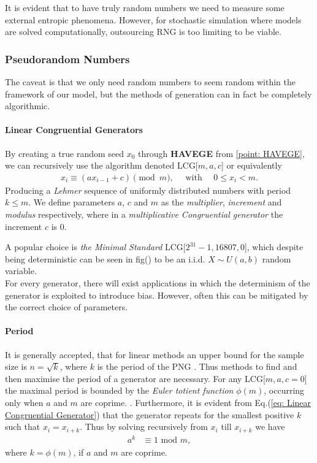 \documentclass{article}
\begin{document}
It is evident that to have truly random numbers we need to measure some external entropic phenomena.
However, for stochastic simulation where models are solved computationally, outsourcing RNG is too 
limiting to be viable.
\subsubsection{Pseudorandom Numbers}
The caveat is that we only need random numbers to seem random within the framework of our model,
but the methods of generation can in fact be completely algorithmic. 

\paragraph{Linear Congruential Generators}
By creating a true random seed $x_0$ through \textbf{HAVEGE} from \ref{point: HAVEGE},
we can recursively use the algorithm denoted LCG[$m,a,c$] or equivalently
\begin{align} 
    \label{eq: Linear Congruential Generator}
    x_{i} \equiv (ax_{i-1} + c) \pmod{m},\quad\text{    with    }\quad0\leq x_{i}<m.
\end{align}
Producing a \textit{Lehmer} sequence of uniformly distributed numbers with period $k \leq m$. 
We define parameters $a$, $c$ and $m$ as the \textit{multiplier}, \textit{increment} 
and \textit{modulus} respectively,
where in a \textit{multiplicative Congruential generator} the increment $c$ is $0$.

A popular choice is \textit{the Minimal Standard} LCG[$2^{31}-1,16807,0$], which 
despite being deterministic can be seen in fig() to be an i.i.d.
$X \sim U(a,b)$ random variable. \cite{alma9954732790001381}\cite{HELLEKALEK1998485}
\\
For every generator, there will exist applications in which the determinism of the generator
is exploited to introduce bias. However, often this can be mitigated by the correct choice of parameters.

\paragraph{Period}
It is generally accepted, that for linear methods an upper bound for the sample size is $n = \sqrt{k}$, 
where $k$ is the period of the PNG \cite{HELLEKALEK1998485}.
Thus methods to find and then maximise the period of a generator are necessary. 
For any LCG[$m,a,c=0$] the maximal period is bounded by the \textit{Euler totient function} $\phi(m)$,
occurring only when $a$ and $m$ are coprime. \cite{gentle2003random}.
Furthermore, it is evident from Eq.(\ref{eq: Linear Congruential Generator}) 
that the generator repeats for the smallest positive $k$ such that $x_{i} = x_{i+k}$.
Thus by solving recursively from $x_i$ till $x_{i+k}$ we have
\begin{align}
    a^{k} &\equiv 1\text{ mod }m,
\end{align}
where $k=\phi(m)$, if $a$ and $m$ are coprime. \cite{gentle2003random}
\end{document}
